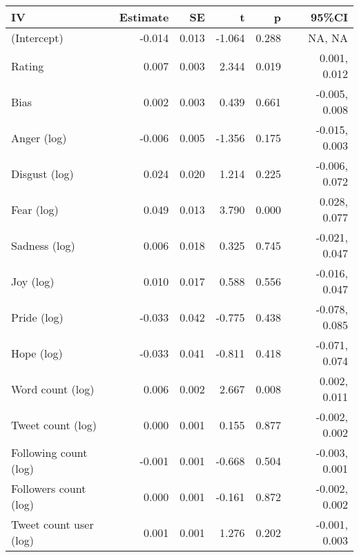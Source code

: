 
\begin{tabular}{lrrrrr}
\toprule
IV & Estimate & SE & t & p & 95\%CI\\
\midrule
(Intercept) & -0.014 & 0.013 & -1.064 & 0.288 & NA, NA\\
Rating & 0.007 & 0.003 & 2.344 & 0.019 & 0.001, 0.012\\
Bias & 0.002 & 0.003 & 0.439 & 0.661 & -0.005, 0.008\\
Anger (log) & -0.006 & 0.005 & -1.356 & 0.175 & -0.015, 0.003\\
Disgust (log) & 0.024 & 0.020 & 1.214 & 0.225 & -0.006, 0.072\\
Fear (log) & 0.049 & 0.013 & 3.790 & 0.000 & 0.028, 0.077\\
Sadness (log) & 0.006 & 0.018 & 0.325 & 0.745 & -0.021, 0.047\\
Joy (log) & 0.010 & 0.017 & 0.588 & 0.556 & -0.016, 0.047\\
Pride (log) & -0.033 & 0.042 & -0.775 & 0.438 & -0.078, 0.085\\
Hope (log) & -0.033 & 0.041 & -0.811 & 0.418 & -0.071, 0.074\\
Word count (log) & 0.006 & 0.002 & 2.667 & 0.008 & 0.002, 0.011\\
Tweet count (log) & 0.000 & 0.001 & 0.155 & 0.877 & -0.002, 0.002\\
Following count (log) & -0.001 & 0.001 & -0.668 & 0.504 & -0.003, 0.001\\
Followers count (log) & 0.000 & 0.001 & -0.161 & 0.872 & -0.002, 0.002\\
Tweet count user (log) & 0.001 & 0.001 & 1.276 & 0.202 & -0.001, 0.003\\
\bottomrule
\end{tabular}
